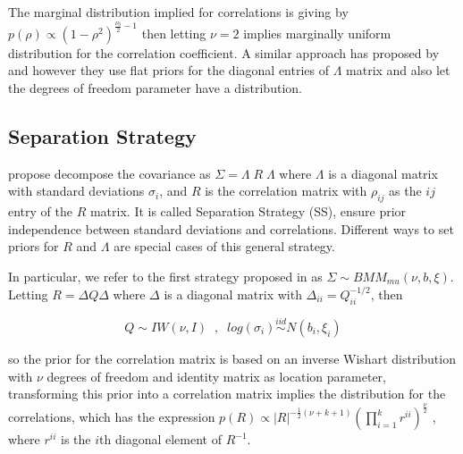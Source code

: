 \documentclass[a4paper]{article}
\begin{document}
The marginal distribution implied for correlations is giving by $p(\rho) \propto (1-\rho^2)^{\frac{\nu_0}{2}-1}$ then letting $\nu=2$ implies marginally uniform distribution for the correlation coefficient. 
A similar approach has proposed by \cite{daniels1999} and \cite{matilde} however they use flat priors for the diagonal entries of $\Lambda$ matrix and also let the degrees of freedom parameter have a distribution.
 
\subsection{Separation Strategy \label{ss.sec} }

\cite{barnard2000} propose decompose the covariance as $\Sigma = \Lambda \; R \; \Lambda$  where $\Lambda$ is a diagonal matrix with  standard deviations $\sigma_{i}$, and $R$ is the correlation matrix with $\rho_{ij}$  as the $ij$ entry of the $R$ matrix. It is called Separation Strategy (SS), ensure prior independence between standard deviations and correlations.  Different ways to set priors for $R$ and $\Lambda$ are special cases of this general strategy. 

In particular, we refer to the first strategy proposed in \cite{barnard2000} as $\Sigma \sim BMM_{mu}(\nu,b,\xi)$.  Letting $R = \Delta Q \Delta$ where $\Delta$ is a diagonal matrix with $\Delta_{ii} = Q_{ii}^{-1/2}$, then 

\begin{equation}
Q \sim IW(\nu, I ) \;\;, \;\;  log(\sigma_i) \stackrel{iid} \sim N(b_i, \xi_i)
\label{eq:ss}
\end{equation} 

so the prior for the correlation matrix is based on an inverse Wishart distribution with $\nu$ degrees of freedom and identity matrix as location parameter, transforming this prior into a correlation matrix implies the distribution for the correlations, which has the expression  $p(R) \propto |R|^{-\frac{1}{2}(\nu+k+1) }  (\prod_{i=1}^k r^{ii}) ^{\frac{\nu}{2}}$ , where $r^{ii}$ is the $i$th diagonal element of $R^{-1}$. 
\end{document}
